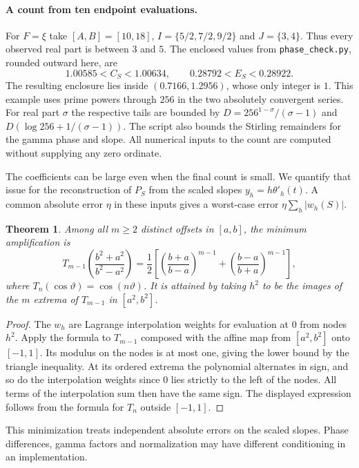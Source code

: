 \documentclass[11pt]{article}
\newtheorem{theorem}{Theorem}
\begin{document}
\paragraph{A count from ten endpoint evaluations.}
For $F=\xi$ take $[A,B]=[10,18]$, $I=\{5/2,7/2,9/2\}$ and $J=\{3,4\}$.
Thus every observed real part is between $3$ and $5$. The enclosed values
from \texttt{phase\_check.py}, rounded outward here, are
\[
 1.00585<C_S<1.00634,\qquad 0.28792<E_S<0.28922 .
\]
The resulting enclosure lies inside $(0.7166,1.2956)$, whose only integer
is $1$. This example uses prime powers through $256$ in the two absolutely
convergent series. For real part $\sigma$ the respective tails are bounded by
$D=256^{1-\sigma}/(\sigma-1)$ and
$D(\log 256+1/(\sigma-1))$. The script also bounds the Stirling remainders
for the gamma phase and slope. All numerical inputs to the count are computed
without supplying any zero ordinate.

The coefficients can be large even when the final count is small. We quantify
that issue for the reconstruction of $P_S$ from the scaled slopes
$y_h=h\theta'_h(t)$. A common absolute error $\eta$ in these inputs gives a
worst-case error $\eta\sum_h |w_h(S)|$.
\begin{theorem}\label{th:minimax}
Among all $m\ge2$ distinct offsets in $[a,b]$, the minimum amplification is
\[
 T_{m-1}\!\left(\frac{b^2+a^2}{b^2-a^2}\right)
 =\frac12\left[\left(\frac{b+a}{b-a}\right)^{m-1}
               +\left(\frac{b-a}{b+a}\right)^{m-1}\right],
\]
where $T_n(\cos\vartheta)=\cos(n\vartheta)$. It is attained by taking
$h^2$ to be the images of the $m$ extrema of $T_{m-1}$ in $[a^2,b^2]$.
\end{theorem}
\begin{proof}
The $w_h$ are Lagrange interpolation weights for evaluation at $0$ from
nodes $h^2$. Apply the formula to $T_{m-1}$ composed with the affine map from
$[a^2,b^2]$ onto $[-1,1]$. Its modulus on the nodes is at most one, giving
the lower bound by the triangle inequality. At its ordered extrema the
polynomial alternates in sign, and so do the interpolation weights since
$0$ lies strictly to the left of the nodes. All terms of the interpolation
sum then have the same sign. The displayed expression follows from the
formula for $T_n$ outside $[-1,1]$.
\end{proof}
This minimization treats independent absolute errors on the scaled slopes.
Phase differences, gamma factors and normalization may have different
conditioning in an implementation.
\end{document}
